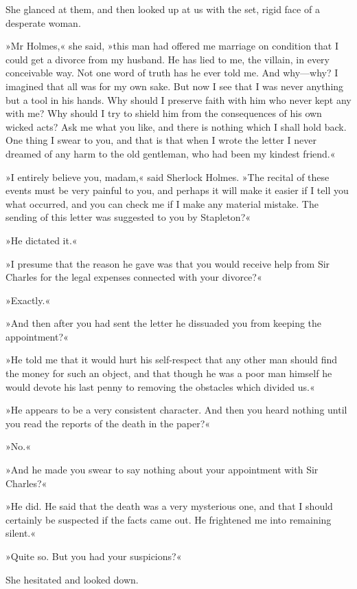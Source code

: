 She glanced at them, and then looked up at us with the set, rigid face of a desperate woman.

»Mr Holmes,« she said, »this man had offered me marriage on condition that I could get a divorce from my husband. He has lied to me, the villain, in every conceivable way. Not one word of truth has he ever told me. And why\allowbreak---\allowbreak why? I imagined that all was for my own sake. But now I see that I was never anything but a tool in his hands. Why should I preserve faith with him who never kept any with me? Why should I try to shield him from the consequences of his own wicked acts? Ask me what you like, and there is nothing which I shall hold back. One thing I swear to you, and that is that when I wrote the letter I never dreamed of any harm to the old gentleman, who had been my kindest friend.«

»I entirely believe you, madam,« said Sherlock Holmes. »The recital of these events must be very painful to you, and perhaps it will make it easier if I tell you what occurred, and you can check me if I make any material mistake. The sending of this letter was suggested to you by Stapleton?«

»He dictated it.«

»I presume that the reason he gave was that you would receive help from Sir Charles for the legal expenses connected with your divorce?«

»Exactly.«

»And then after you had sent the letter he dissuaded you from keeping the appointment?«

»He told me that it would hurt his self-respect that any other man should find the money for such an object, and that though he was a poor man himself he would devote his last penny to removing the obstacles which divided us.«

»He appears to be a very consistent character. And then you heard nothing until you read the reports of the death in the paper?«

»No.«

»And he made you swear to say nothing about your appointment with Sir Charles?«

»He did. He said that the death was a very mysterious one, and that I should certainly be suspected if the facts came out. He frightened me into remaining silent.«

»Quite so. But you had your suspicions?«

She hesitated and looked down.

